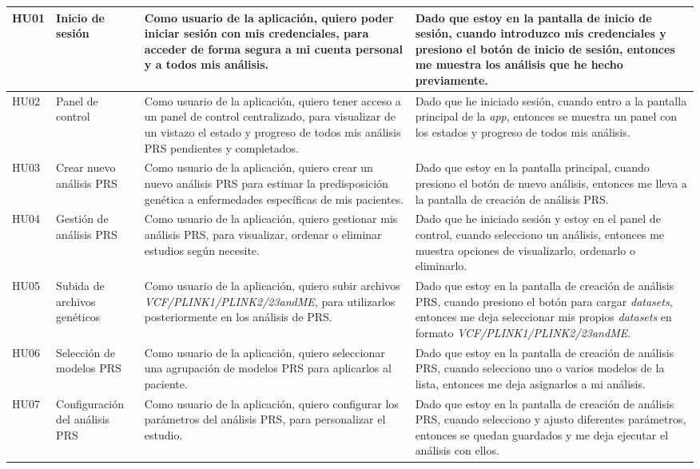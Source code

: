 \begin{longtable}{ p{1cm}  p{2.3cm}  p{5cm}  p{5cm} }
HU01 & Inicio de sesión & Como usuario de la aplicación, quiero poder iniciar sesión con mis credenciales, para acceder de forma segura a mi cuenta personal y a todos mis análisis. & Dado que estoy en la pantalla de inicio de sesión, cuando introduzco mis credenciales y presiono el botón de inicio de sesión, entonces me muestra los análisis que he hecho previamente. \\
\midrule
HU02 & Panel de control & Como usuario de la aplicación, quiero tener acceso a un panel de control centralizado, para visualizar de un vistazo el estado y progreso de todos mis análisis PRS pendientes y completados. & Dado que he iniciado sesión, cuando entro a la pantalla principal de la \textit{app}, entonces se muestra un panel con los estados y progreso de todos mis análisis. \\
\midrule
HU03 & Crear nuevo análisis PRS & Como usuario de la aplicación, quiero crear un nuevo análisis PRS para estimar la predisposición genética a enfermedades específicas de mis pacientes. & Dado que estoy en la pantalla principal, cuando presiono el botón de nuevo análisis, entonces me lleva a la pantalla de creación de análisis PRS. \\
\midrule
HU04 & Gestión de análisis PRS & Como usuario de la aplicación, quiero gestionar mis análisis PRS, para visualizar, ordenar o eliminar estudios según necesite. & Dado que he iniciado sesión y estoy en el panel de control, cuando selecciono un análisis, entonces me muestra opciones de visualizarlo, ordenarlo o eliminarlo. \\
\midrule
HU05 & Subida de archivos genéticos & Como usuario de la aplicación, quiero subir archivos \textit{VCF/PLINK1/PLINK2/23andME}, para utilizarlos posteriormente en los análisis de PRS. & Dado que estoy en la pantalla de creación de análisis PRS, cuando presiono el botón para cargar \textit{datasets}, entonces me deja seleccionar mis propios \textit{datasets} en formato \textit{VCF/PLINK1/PLINK2/23andME}. \\
\midrule
HU06 & Selección de modelos PRS & Como usuario de la aplicación, quiero seleccionar una agrupación de modelos PRS para aplicarlos al paciente. & Dado que estoy en la pantalla de creación de análisis PRS, cuando selecciono uno o varios modelos de la lista, entonces me deja asignarlos a mi análisis. \\
\midrule
HU07 & Configuración del análisis PRS & Como usuario de la aplicación, quiero configurar los parámetros del análisis PRS, para personalizar el estudio. & Dado que estoy en la pantalla de creación de análisis PRS, cuando selecciono y ajusto diferentes parámetros, entonces se quedan guardados y me deja ejecutar el análisis con ellos. \\

\end{longtable}
